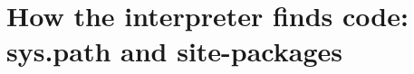 \chapter{How the interpreter finds code: sys.path and site-packages}
\label{ch:how-the-interpreter-finds-code-sys-path}

